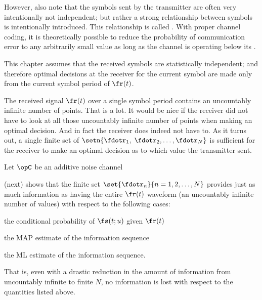 {However, also note that the symbols sent by the transmitter
are often very intentionally not independent;
but rather a strong relationship between symbols is intentionally
introduced. This relationship is called .
With proper channel coding, it is theoretically possible
to reduce the probability of communication error to any
arbitrarily small value as long as the channel is operating below its
.

This chapter assumes that the received symbols are
statistically independent;
and therefore optimal decisions at the receiver
for the current symbol are made
only from the current symbol period of $\fr(t)$.

The received signal $\fr(t)$ over a single symbol period
contains an uncountably infinite number of points.
That is a lot.
It would be nice if the receiver did not have to look
at all those uncountably infinite number of points
when making an optimal decision.
And in fact the receiver does indeed not have to.
As it turns out, a single finite set of 
$\setn{\fdotr_1,\;\fdotr_2,\ldots,\fdotr_N}$
is sufficient for the receiver to make an optimal decision as to
which value the transmitter sent.

\begin{definition}
\label{def:chan_stats}
Let $\opC$ be an additive noise channel
\end{definition}



 (next) shows that the finite set
$\set{\fdotr_n}{n=1,2,\ldots,N}$ provides just as
much information as having the entire $\fr(t)$ waveform
(an uncountably infinite number of values)
with respect to the following cases:
\begin{enume}
   \item the conditional probability of $\fs(t;u)$ given $\fr(t)$
   \item the MAP estimate of the information sequence
   \item the ML estimate of the information sequence.
\end{enume}
That is, even with a drastic reduction in the amount of information
from uncountably infinite to finite $N$,
no information is lost with respect to the quantities listed above.

}
